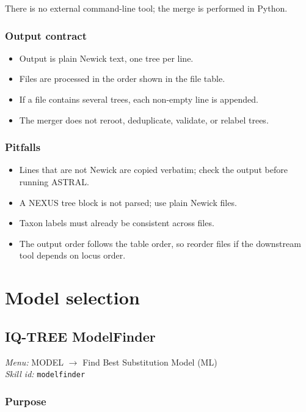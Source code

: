 \documentclass[11pt]{report}
\begin{document}
There is no external command-line tool; the merge is performed in Python.

\subsection{Output contract}

\begin{itemize}
  \item Output is plain Newick text, one tree per line.
  \item Files are processed in the order shown in the file table.
  \item If a file contains several trees, each non-empty line is appended.
  \item The merger does not reroot, deduplicate, validate, or relabel trees.
\end{itemize}

\subsection{Pitfalls}

\begin{itemize}
  \item Lines that are not Newick are copied verbatim; check the output before running ASTRAL.
  \item A NEXUS tree block is not parsed; use plain Newick files.
  \item Taxon labels must already be consistent across files.
  \item The output order follows the table order, so reorder files if the downstream tool depends on locus order.
\end{itemize}


\chapter{Model selection}
\section{IQ-TREE ModelFinder}
\noindent\textit{Menu:} MODEL $\rightarrow$ Find Best Substitution Model (ML)\\
\noindent\textit{Skill id:} \texttt{modelfinder}

\subsection{Purpose}
\end{document}
